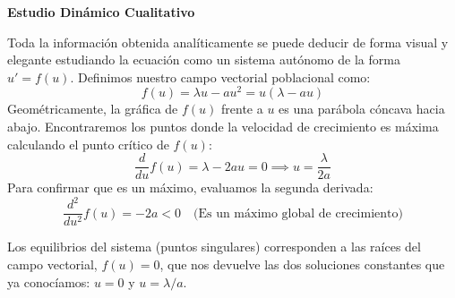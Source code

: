 {    \begin{center}
    \end{center}

    \textbf{Estudio Dinámico Cualitativo}
    
    Toda la información obtenida analíticamente se puede deducir de forma visual y elegante estudiando la ecuación como un sistema autónomo de la forma $u' = f(u)$. Definimos nuestro campo vectorial poblacional como:
    \[
        f(u) = \lambda u - a u^2 = u(\lambda - a u)
    \]
    Geométricamente, la gráfica de $f(u)$ frente a $u$ es una parábola cóncava hacia abajo. Encontraremos los puntos donde la velocidad de crecimiento es máxima calculando el punto crítico de $f(u)$:
    \[
        \frac{d}{du} f(u) = \lambda - 2 a u = 0 \implies u = \frac{\lambda}{2 a}
    \]
    Para confirmar que es un máximo, evaluamos la segunda derivada:
    \[
        \frac{d^2}{du^2} f(u) = -2 a < 0 \quad \text{(Es un máximo global de crecimiento)}
    \]
    
    Los equilibrios del sistema (puntos singulares) corresponden a las raíces del campo vectorial, $f(u) = 0$, que nos devuelve las dos soluciones constantes que ya conocíamos: $u = 0$ y $u = \lambda/a$. 
    
}

